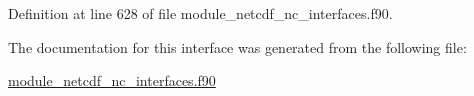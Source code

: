Definition at line 628 of file module\+\_\+netcdf\+\_\+nc\+\_\+interfaces.\+f90.



The documentation for this interface was generated from the following file\+:\begin{DoxyCompactItemize}
\item 
\hyperlink{module__netcdf__nc__interfaces_8f90}{module\+\_\+netcdf\+\_\+nc\+\_\+interfaces.\+f90}\end{DoxyCompactItemize}
